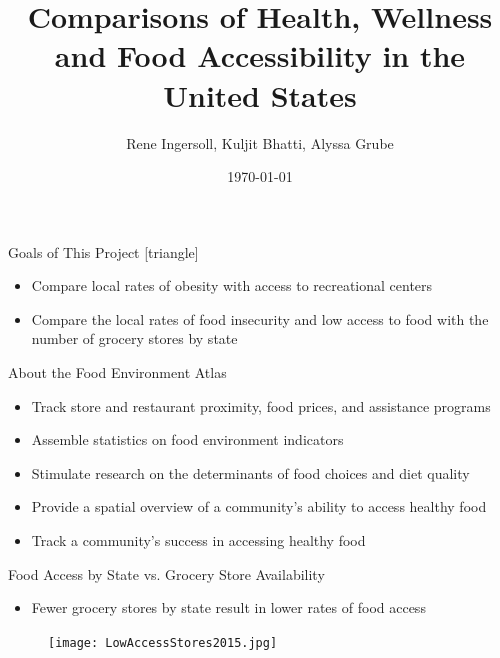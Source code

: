 \documentclass{beamer} %
\title[Comparisons of Health, Wellness and Food Accessibility in the United States]{Comparisons of Health, Wellness and Food Accessibility in the United States}
\institute[UNL]{University of Nebraska-Lincoln}
\author{Rene Ingersoll, Kuljit Bhatti, Alyssa Grube}
\date{\today}
\begin{document}


 

\begin{frame}

                \titlepage

\end{frame}



\begin{frame}{Goals of This Project}
  [triangle]
    \begin{itemize}
      \item Compare local rates of obesity with access to recreational centers
      \item Compare the local rates of food insecurity and low access to food with the number of grocery stores by state
    \end{itemize}
\end{frame}


\begin{frame}{About the Food Environment Atlas}
  \begin{itemize}
    \item Track store and restaurant proximity, food prices, and assistance programs
    \item Assemble statistics on food environment indicators
    \item Stimulate research on the determinants of food choices and diet quality
    \item Provide a spatial overview of a community's ability to access healthy food
    \item Track a community's success in accessing healthy food
  \end{itemize}
\end{frame}


\begin{frame}{Food Access by State vs. Grocery Store Availability}
 \begin{itemize}
  \item Fewer grocery stores by state result in lower rates of food access
 \end{itemize}
 \begin{figure}
   \texttt{[image: LowAccessStores2015.jpg]}
   \hfill
 \end{figure}
\end{frame}
\end{document}
